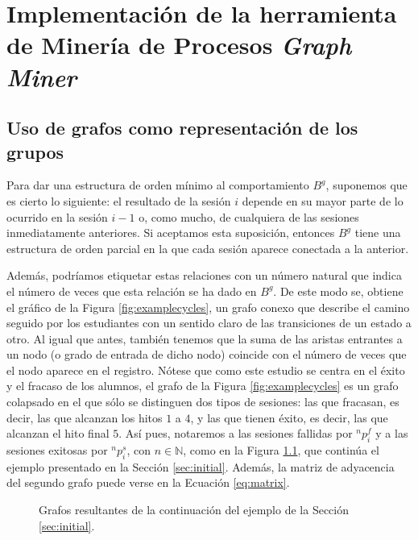 \chapter{Implementación de la herramienta de Minería de Procesos \emph{Graph Miner}}\label{sec:chapterIV}

\section{Uso de grafos como representación de los grupos}

Para dar una estructura de orden mínimo al comportamiento $B^g$, suponemos que es cierto lo siguiente: el resultado de la sesión $i$ depende en su mayor parte de lo ocurrido en la sesión $i-1$ o, como mucho, de cualquiera de las sesiones inmediatamente anteriores. Si aceptamos esta suposición, entonces $B^g$ tiene una estructura de orden parcial en la que cada sesión aparece conectada a la anterior.

Además, podríamos etiquetar estas relaciones con un número natural que indica el número de veces que esta relación se ha dado en $B^g$. De este modo se, obtiene el gráfico de la Figura \ref{fig:examplecycles}, un grafo conexo que describe el camino seguido por los estudiantes con un sentido claro de las transiciones de un estado a otro. Al igual que antes, también tenemos que la suma de las aristas entrantes a un nodo (o grado de entrada de dicho nodo) coincide con el número de veces que el nodo aparece en el registro. Nótese que como este estudio se centra en el éxito y el fracaso de los alumnos, el grafo de la Figura \ref{fig:examplecycles} es un grafo colapsado en el que sólo se distinguen dos tipos de sesiones: las que fracasan, es decir, las que alcanzan los hitos $1$ a $4$, y las que tienen éxito, es decir, las que alcanzan el hito final $5$. Así pues, notaremos a las sesiones fallidas por $^np_i^f$ y a las sesiones exitosas por $^np_i^s$, con $n \in \mathbb{N}$, como en la Figura \ref{fig:examples}, que continúa el ejemplo presentado en la Sección \ref{sec:initial}. Además, la matriz de adyacencia del segundo grafo puede verse en la Ecuación \ref{eq:matrix}.

\begin{figure}[H]
\centering
{}\qquad
{}
\caption{Grafos resultantes de la continuación del ejemplo de la Sección \ref{sec:initial}.}
\label{fig:examples}
\end{figure}

